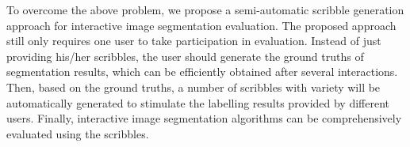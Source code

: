 \documentclass[runningheads,a4paper]{llncs}
\begin{document}

To overcome the above problem, we propose a semi-automatic scribble generation approach for interactive image segmentation evaluation. The proposed approach still only requires one user to take participation in evaluation. Instead of just providing his/her scribbles, the user should generate the ground truths of segmentation results, which can be efficiently obtained after several interactions. Then, based on the ground truths, a number of scribbles with variety will be automatically generated to stimulate the labelling results provided by different users. Finally, interactive image segmentation algorithms can be comprehensively evaluated using the scribbles.

\end{document}

